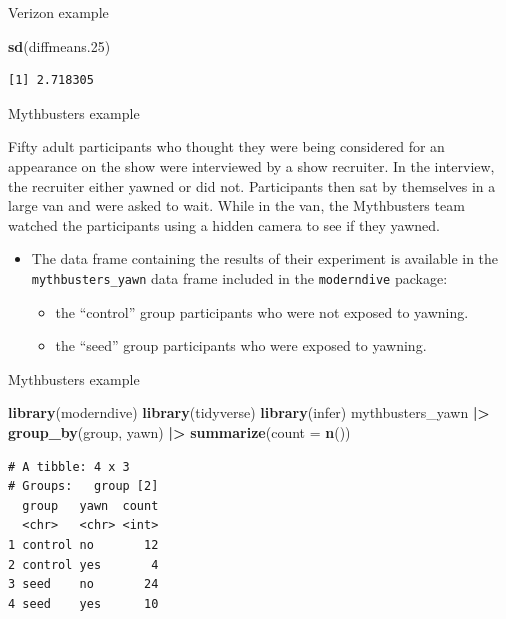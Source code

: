 \documentclass[
  ignorenonframetext,
]{beamer}
\newenvironment{Shaded}{\begin{snugshade}}{\end{snugshade}}
\newcommand{\AttributeTok}[1]{\textcolor[rgb]{0.13,0.29,0.53}{#1}}
\newcommand{\FloatTok}[1]{\textcolor[rgb]{0.00,0.00,0.81}{#1}}
\newcommand{\FunctionTok}[1]{\textcolor[rgb]{0.13,0.29,0.53}{\textbf{#1}}}
\newcommand{\NormalTok}[1]{#1}
\newcommand{\SpecialCharTok}[1]{\textcolor[rgb]{0.81,0.36,0.00}{\textbf{#1}}}
\providecommand{\tightlist}{%
  \setlength{\itemsep}{0pt}\setlength{\parskip}{0pt}}
\begin{document}
\begin{frame}[fragile]{Verizon example}
\begin{Shaded}
\begin{Highlighting}[]
\FunctionTok{sd}\NormalTok{(diffmeans}\FloatTok{.25}\NormalTok{)}
\end{Highlighting}
\end{Shaded}

\begin{verbatim}
[1] 2.718305
\end{verbatim}

\normalsize
\end{frame}

\begin{frame}[fragile]{Mythbusters example}
\protect\hypertarget{mythbusters-example}{}
\begin{tcolorbox}
Fifty adult participants who thought they were being considered for an appearance on the show were interviewed by a show recruiter. In the interview, the recruiter either yawned or did not. Participants then sat by themselves in a large van and were asked to wait. While in the van, the Mythbusters team watched the participants using a hidden camera to see if they yawned. 
\end{tcolorbox}

\begin{itemize}
\item
  The data frame containing the results of their experiment is available
  in the \texttt{mythbusters\_yawn} data frame included in the
  \texttt{moderndive} package:

  \begin{itemize}
  \tightlist
  \item
    the ``control'' group participants who were not exposed to yawning.
  \item
    the ``seed'' group participants who were exposed to yawning.
  \end{itemize}
\end{itemize}
\end{frame}

\begin{frame}[fragile]{Mythbusters example}
\protect\hypertarget{mythbusters-example-1}{}
\small

\begin{Shaded}
\begin{Highlighting}[]
\FunctionTok{library}\NormalTok{(moderndive)}
\FunctionTok{library}\NormalTok{(tidyverse)}
\FunctionTok{library}\NormalTok{(infer)}
\NormalTok{mythbusters\_yawn }\SpecialCharTok{|\textgreater{}} 
  \FunctionTok{group\_by}\NormalTok{(group, yawn) }\SpecialCharTok{|\textgreater{}} 
  \FunctionTok{summarize}\NormalTok{(}\AttributeTok{count =} \FunctionTok{n}\NormalTok{())}
\end{Highlighting}
\end{Shaded}

\begin{verbatim}
# A tibble: 4 x 3
# Groups:   group [2]
  group   yawn  count
  <chr>   <chr> <int>
1 control no       12
2 control yes       4
3 seed    no       24
4 seed    yes      10
\end{verbatim}

\normalsize
\end{frame}
\end{document}
